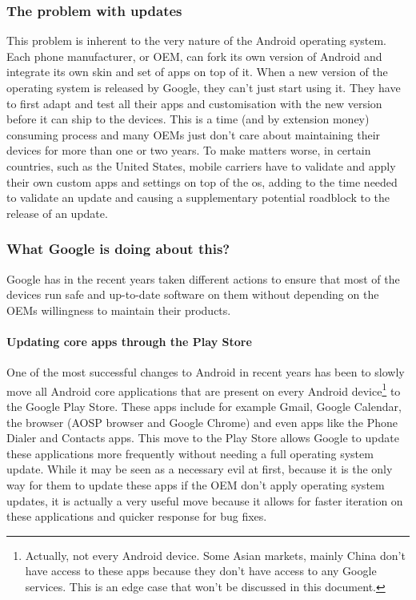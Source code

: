\documentclass[twoside, openright,11pt,a4paper]{book}
\begin{document}
\subsubsection{The problem with updates}
This problem is inherent to the very nature of the Android operating system. Each phone manufacturer, or OEM, can fork its own version of Android and integrate its own skin and set of apps on top of it. When a new version of the operating system is released by Google, they can't just start using it. They have to first adapt and test all their apps and customisation with the new version before it can ship to the devices. This is a time (and by extension money) consuming process and many OEMs just don't care about maintaining their devices for more than one or two years. To make matters worse, in certain countries, such as the United States, mobile carriers have to validate and apply their own custom apps and settings on top of the \gls{os}, adding to the time needed to validate an update and causing a supplementary potential roadblock to the release of an update.

\subsubsection{What Google is doing about this?}
Google has in the recent years taken different actions to ensure that most of the devices run safe and up-to-date software on them without depending on the OEMs willingness to maintain their products.
\paragraph{Updating core apps through the Play Store}
One of the most successful changes to Android in recent years has been to slowly move all Android core applications that are present on every Android device\footnote{Actually, not every Android device. Some Asian markets, mainly China don't have access to these apps because they don't have access to any Google services. This is an edge case that won't be discussed in this document. } to the Google Play Store. These apps include for example Gmail, Google Calendar, the browser (AOSP browser and Google Chrome) and even apps like the Phone Dialer and Contacts apps. This move to the Play Store allows Google to update these applications more frequently without needing a full operating system update. While it may be seen as a necessary evil at first, because it is the only way for them to update these apps if the OEM don't apply operating system updates, it is actually a very useful move because it allows for faster iteration on these applications and quicker response for bug fixes.\\
\end{document}
